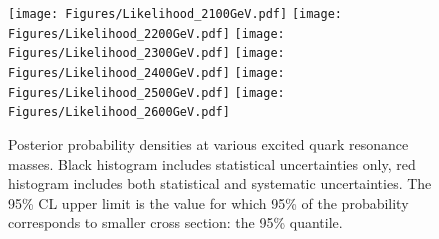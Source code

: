 \begin{figure}[!ht]
  \begin{center}
     \texttt{[image: Figures/Likelihood\_2100GeV.pdf]}
     \texttt{[image: Figures/Likelihood\_2200GeV.pdf]}
     \texttt{[image: Figures/Likelihood\_2300GeV.pdf]}
     \texttt{[image: Figures/Likelihood\_2400GeV.pdf]}
     \texttt{[image: Figures/Likelihood\_2500GeV.pdf]} 
     \texttt{[image: Figures/Likelihood\_2600GeV.pdf]} 
\caption{Posterior probability densities at
 various excited quark resonance masses.  Black histogram includes statistical
 uncertainties only, red histogram includes both statistical and systematic
 uncertainties. The 95\% CL upper limit is the value for which 95\% of 
 the probability corresponds to smaller cross section: the 95\% quantile.}
    \label{likeli5}
  \end{center}
\end{figure}

